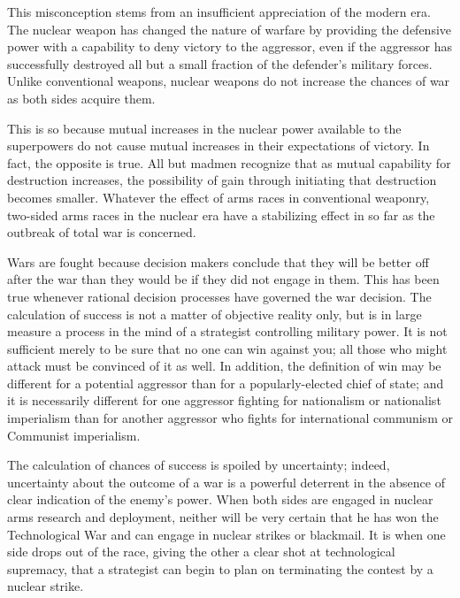 This misconception stems from an insufficient appreciation of the modern era. The nuclear weapon has changed the nature of warfare by providing the defensive power with a capability to deny victory to the aggressor, even if the aggressor has successfully destroyed all but a small fraction of the defender's military forces. Unlike conventional weapons, nuclear weapons do not increase the chances of war as both sides acquire them.

This is so because mutual increases in the nuclear power available to the superpowers do not cause mutual increases in their expectations of victory. In fact, the opposite is true. All but madmen recognize that as mutual capability for destruction increases, the possibility of gain through initiating that destruction becomes smaller. Whatever the effect of arms races in conventional weaponry, two-sided arms races in the nuclear era have a stabilizing effect in so far as the outbreak of total war is concerned.

Wars are fought because decision makers conclude that they will be better off after the war than they would be if they did not engage in them. This has been true whenever rational decision processes have governed the war decision. The calculation of success is not a matter of objective reality only, but is in large measure a process in the mind of a strategist controlling military power. It is not sufficient merely to be sure that no one can win against you; all those who might attack must be convinced of it as well. In addition, the definition of win may be different for a potential aggressor than for a popularly-elected chief of state; and it is necessarily different for one aggressor fighting for nationalism or nationalist imperialism than for another aggressor who fights for international communism or Communist imperialism.

The calculation of chances of success is spoiled by uncertainty; indeed, uncertainty about the outcome of a war is a powerful deterrent in the absence of clear indication of the enemy's power. When both sides are engaged in nuclear arms research and deployment, neither will be very certain that he has won the Technological War and can engage in nuclear strikes or blackmail. It is when one side drops out of the race, giving the other a clear shot at technological supremacy, that a strategist can begin to plan on terminating the contest by a nuclear strike.


